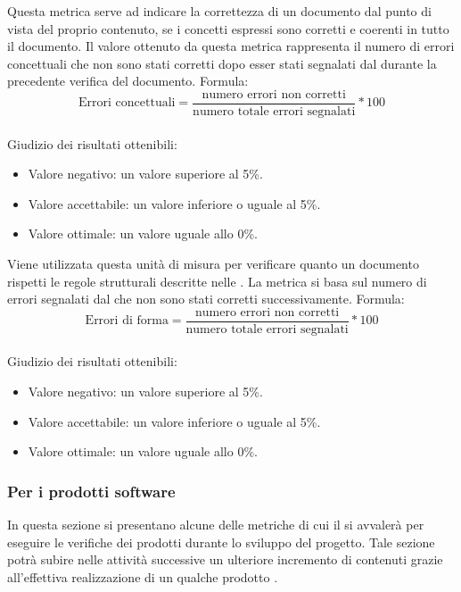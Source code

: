 \documentclass[a4paper, titlepage]{article}
\begin{document}
\label{par:errcon}
Questa metrica serve ad indicare la correttezza di un documento dal punto di vista del proprio contenuto, se i concetti espressi sono corretti e coerenti in tutto il documento.
\newline Il valore ottenuto da questa metrica rappresenta il numero di errori concettuali che non sono stati corretti dopo esser stati segnalati dal  durante la precedente verifica del documento.
\newline Formula:
\begin{displaymath}
\mbox{Errori concettuali}=\frac{\mbox{numero errori non corretti}}{\mbox{numero totale errori segnalati}}*100
\end{displaymath}
\\
\newline Giudizio dei risultati ottenibili:
\begin{itemize}
\item Valore negativo: un valore superiore al 5\%. 
\item Valore accettabile: un valore inferiore o uguale al 5\%.
\item Valore ottimale: un valore uguale allo 0\%.
\end{itemize}

\label{par:errfor}
Viene utilizzata questa unità di misura per verificare quanto un documento rispetti le regole strutturali descritte nelle . 
\newline La metrica si basa sul numero di errori segnalati dal  che non sono stati corretti successivamente.
\newline Formula:
\begin{displaymath}
\mbox{Errori di forma}=\frac{\mbox{numero errori non corretti}}{\mbox{numero totale errori segnalati}}*100
\end{displaymath}
\\
\newline Giudizio dei risultati ottenibili:
\begin{itemize}
\item Valore negativo: un valore superiore al 5\%. 
\item Valore accettabile: un valore inferiore o uguale al 5\%.
\item Valore ottimale: un valore uguale allo 0\%.
\end{itemize}

\subsubsection{Per i prodotti software}
In questa sezione si presentano alcune delle metriche di cui il  si avvalerà per eseguire le verifiche dei prodotti  durante lo sviluppo del progetto. Tale sezione potrà subire nelle attività successive un ulteriore incremento di contenuti grazie all'effettiva realizzazione di un qualche prodotto . 
\end{document}
